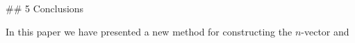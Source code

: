 

## 5 Conclusions

In this paper we have presented a new method for constructing the \(n\)-vector and
